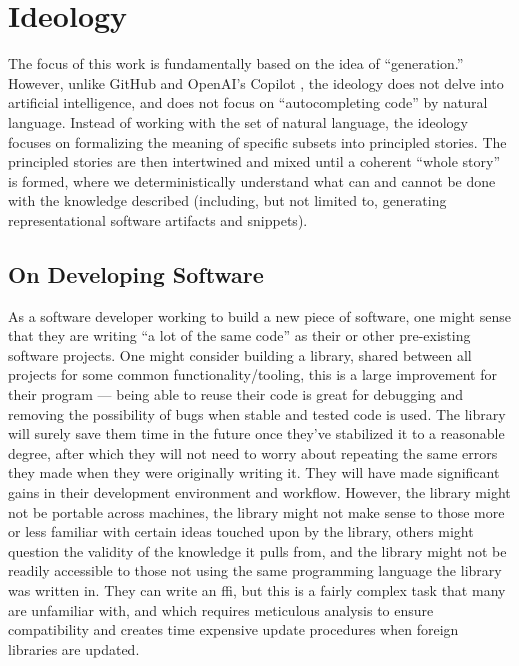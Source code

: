 \chapter{Ideology}
\label{chap:ideology}


The focus of this work is fundamentally based on the idea of ``generation.''
However, unlike GitHub and OpenAI's Copilot \cite{Copilot}, the ideology does
not delve into artificial intelligence, and does not focus on ``autocompleting
code'' by natural language. Instead of working with the set of natural language,
the ideology focuses on formalizing the meaning of specific subsets into
principled stories. The principled stories are then intertwined and mixed until
a coherent ``whole story'' is formed, where we deterministically understand what
can and cannot be done with the knowledge described (including, but not limited
to, generating representational software artifacts and snippets).

\section{On Developing Software}
\label{sec:idlgy:on_developing_software}

As a software developer working to build a new piece of software, one might
sense that they are writing ``a lot of the same code'' as their or other
pre-existing software projects. One might consider building a library, shared
between all projects for some common functionality/tooling, this is a large
improvement for their program --- being able to reuse their code is great for
debugging and removing the possibility of bugs when stable and tested code is
used. The library will surely save them time in the future once they've
stabilized it to a reasonable degree, after which they will not need to worry
about repeating the same errors they made when they were originally writing it.
They will have made significant gains in their development environment and
workflow. However, the library might not be portable across machines, the
library might not make sense to those more or less familiar with certain ideas
touched upon by the library, others might question the validity of the knowledge
it pulls from, and the library might not be readily accessible to those not
using the same programming language the library was written in. They can write
an \acs{ffi}, but this is a fairly complex task that many are unfamiliar with,
and which requires meticulous analysis to ensure compatibility and creates time
expensive update procedures when foreign libraries are updated.

